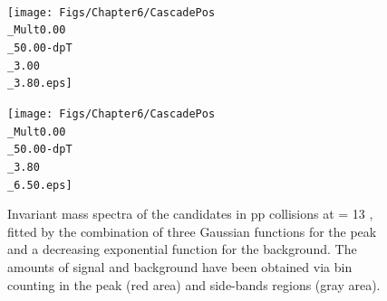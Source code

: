 \begin{figure}[!p]
\begin{minipage}[t]{.5\textwidth}
    \end{minipage}\\
    \begin{minipage}[t]{.5\textwidth}
        \hspace*{-1.5cm}
        \texttt{[image: Figs/Chapter6/CascadePos\\\_Mult0.00\\\_50.00-dpT\\\_3.00\\\_3.80.eps]}
    \end{minipage}
    \hfill
    \begin{minipage}[t]{.5\textwidth}
        \hspace*{0.5cm}
        \texttt{[image: Figs/Chapter6/CascadePos\\\_Mult0.00\\\_50.00-dpT\\\_3.80\\\_6.50.eps]}
    \end{minipage}
    \hfill
\caption{Invariant mass spectra of the \rmAomegaP candidates in pp collisions at \sqrtS = 13 \tev, fitted by the combination of three Gaussian functions for the peak and a decreasing exponential function for the background. The amounts of signal and background have been obtained via bin counting in the peak (red area) and side-bands regions (gray area).}
	\label{fig:InvMassOmegaPlusVsPt}
\end{figure}




